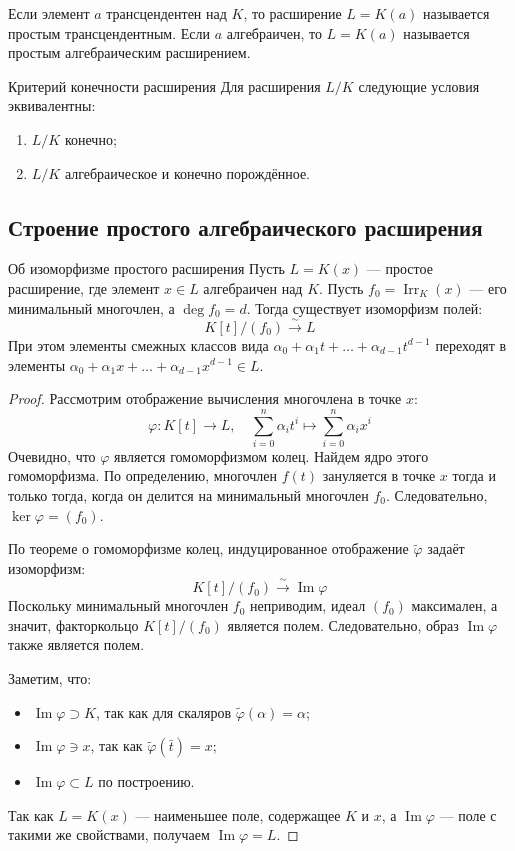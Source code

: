 \begin{Remark}{}{}
	Если элемент $a$ трансцендентен над $K$, то расширение $L = K(a)$ называется простым трансцендентным. Если $a$ алгебраичен, то $L = K(a)$ называется простым алгебраическим расширением.
\end{Remark}

\begin{Theorem}{Критерий конечности расширения}{}
	Для расширения $L/K$ следующие условия эквивалентны:
	\begin{enumerate}
		\item $L/K$ конечно;
		\item $L/K$ алгебраическое и конечно порождённое.
	\end{enumerate}
\end{Theorem}

\subsection{Строение простого алгебраического расширения}

\begin{Theorem}{Об изоморфизме простого расширения}{}
	Пусть $L = K(x)$ --- простое расширение, где элемент $x \in L$ алгебраичен над $K$. Пусть $f_0 = \operatorname{Irr}_K(x)$ --- его минимальный многочлен, а $\deg f_0 = d$. 
	Тогда существует изоморфизм полей:
	\[ K[t]/(f_0) \xrightarrow{\sim} L \]
	При этом элементы смежных классов вида $\alpha_0 + \alpha_1 t + \dots + \alpha_{d-1} t^{d-1}$ переходят в элементы $\alpha_0 + \alpha_1 x + \dots + \alpha_{d-1} x^{d-1} \in L$.
\end{Theorem}

\begin{proof}
	Рассмотрим отображение вычисления многочлена в точке $x$:
	\[ \varphi: K[t] \to L, \quad \sum_{i=0}^n \alpha_i t^i \mapsto \sum_{i=0}^n \alpha_i x^i \]
	Очевидно, что $\varphi$ является гомоморфизмом колец.
	Найдем ядро этого гомоморфизма. По определению, многочлен $f(t)$ зануляется в точке $x$ тогда и только тогда, когда он делится на минимальный многочлен $f_0$. Следовательно, $\ker \varphi = (f_0)$.
	
	По теореме о гомоморфизме колец, индуцированное отображение $\tilde{\varphi}$ задаёт изоморфизм:
	\[ K[t]/(f_0) \xrightarrow{\sim} \operatorname{Im} \varphi \]
	Поскольку минимальный многочлен $f_0$ неприводим, идеал $(f_0)$ максимален, а значит, факторкольцо $K[t]/(f_0)$ является полем. Следовательно, образ $\operatorname{Im} \varphi$ также является полем.
	
	Заметим, что:
	\begin{itemize}
		\item $\operatorname{Im} \varphi \supset K$, так как для скаляров $\tilde{\varphi}(\alpha) = \alpha$;
		\item $\operatorname{Im} \varphi \ni x$, так как $\tilde{\varphi}(\bar{t}) = x$;
		\item $\operatorname{Im} \varphi \subset L$ по построению.
	\end{itemize}
	Так как $L = K(x)$ --- наименьшее поле, содержащее $K$ и $x$, а $\operatorname{Im} \varphi$ --- поле с такими же свойствами, получаем $\operatorname{Im} \varphi = L$. 
\end{proof}

